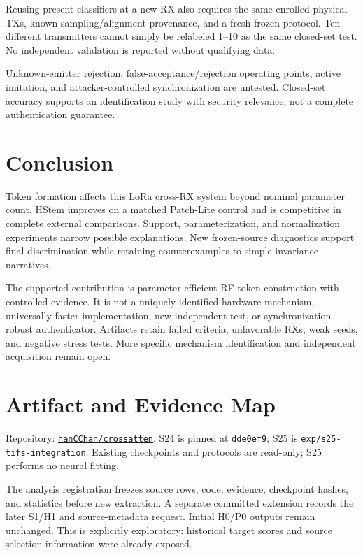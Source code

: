 \documentclass[journal]{IEEEtran}
\begin{document}
Reusing present classifiers at a new RX also requires the same enrolled physical TXs, known sampling/alignment provenance, and a fresh frozen protocol. Ten different transmitters cannot simply be relabeled 1--10 as the same closed-set test. No independent validation is reported without qualifying data.

Unknown-emitter rejection, false-acceptance/rejection operating points, active imitation, and attacker-controlled synchronization are untested. Closed-set accuracy supports an identification study with security relevance, not a complete authentication guarantee.

\section{Conclusion}
Token formation affects this LoRa cross-RX system beyond nominal parameter count. HStem improves on a matched Patch-Lite control and is competitive in complete external comparisons. Support, parameterization, and normalization experiments narrow possible explanations. New frozen-source diagnostics support final discrimination while retaining counterexamples to simple invariance narratives.

The supported contribution is parameter-efficient RF token construction with controlled evidence. It is not a uniquely identified hardware mechanism, universally faster implementation, new independent test, or synchronization-robust authenticator. Artifacts retain failed criteria, unfavorable RXs, weak seeds, and negative stress tests. More specific mechanism identification and independent acquisition remain open.

\appendices
\section{Artifact and Evidence Map}
Repository: \href{https://github.com/hanCChan/crossatten}{\texttt{hanCChan/crossatten}}. S24 is pinned at \texttt{dde0ef9}; S25 is \texttt{exp/s25-tifs-integration}. Existing checkpoints and protocols are read-only; S25 performs no neural fitting.

The analysis registration freezes source rows, code, evidence, checkpoint hashes, and statistics before new extraction. A separate committed extension records the later S1/H1 and source-metadata request. Initial H0/P0 outputs remain unchanged. This is explicitly exploratory: historical target scores and source selection information were already exposed.
\end{document}
